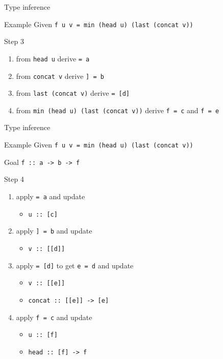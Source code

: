 \documentclass{beamer}
\def\code#1{\texttt{\frenchspacing#1}}
\begin{document}
\begin{frame}{Type inference}

\begin{exampleblock}{Example}
Given \code{f u v = min (head u) (last (concat v))}

\vspace{0.25cm}
Step 3\pause
\begin{enumerate}
    \item from \code{head u} derive \code{[c] = a}\pause
    \item from \code{concat v} derive \code{[[d]] = b}\pause
    \item from \code{last (concat v)} derive \code{[e] = [d]}\pause
    \item from \code{min (head u) (last (concat v))} derive \code{f = c} and \code{f = e}
\end{enumerate}
\end{exampleblock}

\end{frame}

\begin{frame}{Type inference}

\begin{exampleblock}{Example}
Given \code{f u v = min (head u) (last (concat v))} \par
Goal \code{f :: a -> b -> f}

\vspace{0.25cm}
Step 4\pause
\begin{enumerate}
    \item apply \code{[c] = a} and update\pause
        \begin{itemize}
            \item \code{u :: [c]}\pause
        \end{itemize}
    \item apply \code{[[d]] = b} and update\pause
        \begin{itemize}
            \item \code{v :: [[d]]}\pause
        \end{itemize}
    \item apply \code{[e] = [d]} to get \code{e = d} and update\pause
        \begin{itemize}
            \item \code{v :: [[e]]}\pause
            \item \code{concat :: [[e]] -> [e]}\pause
        \end{itemize}
    \item apply \code{f = c} and update\pause
        \begin{itemize}
            \item \code{u :: [f]}\pause
            \item \code{head :: [f] -> f}
        \end{itemize}
\end{enumerate}
\end{exampleblock}

\end{frame}
\end{document}
